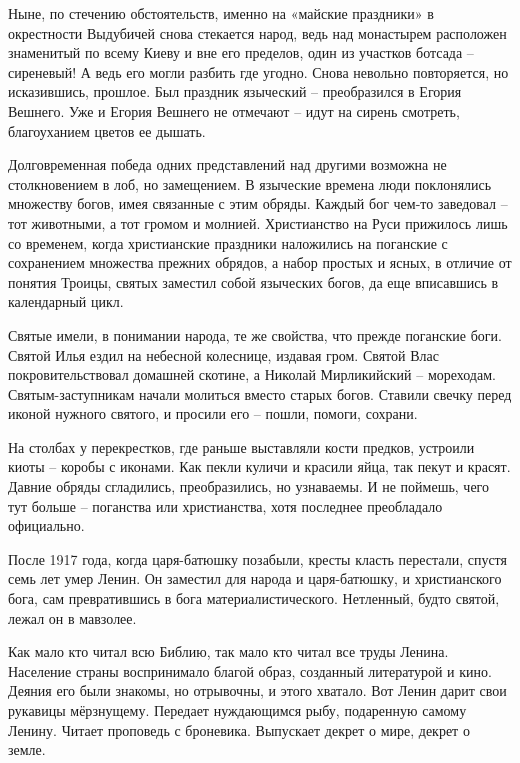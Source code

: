 Ныне, по стечению обстоятельств, именно на «майские праздники» в окрестности Выдубичей снова стекается народ, ведь над монастырем расположен знаменитый по всему Киеву и вне его пределов, один из участков ботсада – сиреневый! А ведь его могли разбить где угодно. Снова невольно повторяется, но исказившись, прошлое. Был праздник языческий – преобразился в Егория Вешнего. Уже и Егория Вешнего не отмечают – идут на сирень смотреть, благоуханием цветов ее дышать.



Долговременная победа одних представлений над другими возможна не столкновением в лоб, но замещением. В языческие времена люди поклонялись множеству богов, имея связанные с этим обряды. Каждый бог чем-то заведовал – тот животными, а тот громом и молнией. Христианство на Руси прижилось лишь со временем, когда христианские праздники наложились на поганские с сохранением множества прежних обрядов, а набор простых и ясных, в отличие от понятия Троицы, святых заместил собой языческих богов, да еще вписавшись в календарный цикл. 

Святые имели, в понимании народа, те же свойства, что прежде поганские боги. Святой Илья ездил на небесной колеснице, издавая гром. Святой Влас покровительствовал домашней скотине, а Николай Мирликийский – мореходам. Святым-заступникам начали молиться вместо старых богов. Ставили свечку перед иконой нужного святого, и просили его – пошли, помоги, сохрани.

На столбах у перекрестков, где раньше выставляли кости предков, устроили киоты – коробы с иконами. Как пекли куличи и красили яйца, так пекут и красят. Давние обряды сгладились, преобразились, но узнаваемы. И не поймешь, чего тут больше – поганства или христианства, хотя последнее преобладало официально.

После 1917 года, когда царя-батюшку позабыли, кресты класть перестали, спустя семь лет умер Ленин. Он заместил для народа и царя-батюшку, и христианского бога, сам превратившись в бога материалистического. Нетленный, будто святой, лежал он в мавзолее.

Как мало кто читал всю Библию, так мало кто читал все труды Ленина. Население страны воспринимало благой образ, созданный литературой и кино. Деяния его были знакомы, но отрывочны, и этого хватало. Вот Ленин дарит свои рукавицы мёрзнущему. Передает нуждающимся рыбу, подаренную самому Ленину. Читает проповедь с броневика. Выпускает декрет о мире, декрет о земле.

